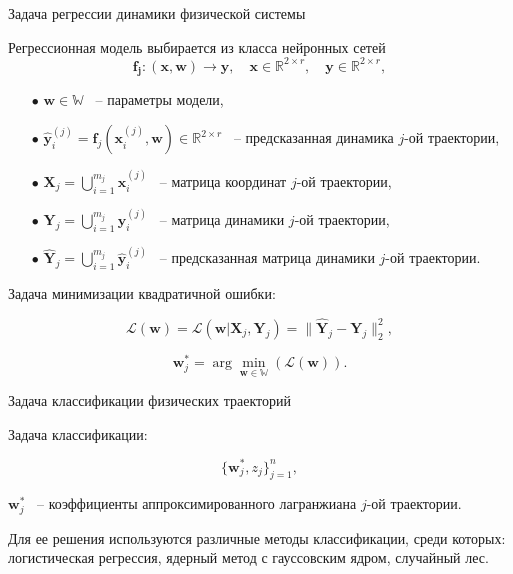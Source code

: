 \documentclass{beamer}
\begin{document}
\begin{frame}{Задача регрессии динамики физической системы}

    Регрессионная модель выбирается из класса нейронных сетей
    $$\mathbf{f_j} \colon (\mathbf{x}, \mathbf{w}) \to \mathbf{y}, \quad \mathbf{x} \in \mathbb{R}^{2 \times r}, \quad \mathbf{y} \in \mathbb{R}^{2 \times r},$$ 
    
    \begin{itemize}
    
            \item[$\bullet$] $\mathbf{w} \in \mathbb{W}$ ~-- параметры модели, 

            \item[$\bullet$] $\hat{\mathbf{y}}_i^{(j)} = \mathbf{f}_j (\mathbf{x}_i^{(j)}, \mathbf{w}) \in \mathbb{R}^{2 \times r}$ ~-- предсказанная динамика $j$-ой траектории,
        
            \item[$\bullet$] $\mathbf{X}_j = \bigcup_{i=1}^{m_j} \mathbf{x}_i^{(j)}$ ~-- матрица координат $j$-ой траектории,
            
            \item[$\bullet$] $\mathbf{Y}_j = \bigcup_{i=1}^{m_j} \mathbf{y}_i^{(j)}$ ~-- матрица динамики $j$-ой траектории,
            
            \item[$\bullet$] $\hat{\mathbf{Y}}_j = \bigcup_{i=1}^{m_j} \hat{\mathbf{y}}_i^{(j)}$ ~-- предсказанная матрица динамики $j$-ой траектории.
        
        \end{itemize}

        Задача минимизации квадратичной ошибки: 

        $$\mathcal{L}(\textbf{w}) = \mathcal{L}(\mathbf{w} | \mathbf{X}_j, \mathbf{Y}_j) = \| \hat{\mathbf{Y}}_j - \mathbf{Y}_j \|_2^2,$$
    
        $$\textbf{w}_j^* = \arg \min_{\mathbf{w} \in \mathbb{W}} \left( \mathcal{L}(\textbf{w}) \right).$$

\end{frame}


\begin{frame}{Задача классификации физических траекторий}

        Задача классификации:

        $$\{\textbf{w}^*_j, z_j\}_{j=1}^n,$$
        
        $\textbf{w}^*_j$ ~-- коэффициенты аппроксимированного лагранжиана $j$-ой траектории.
    
        Для ее решения используются различные методы классификации, среди которых: логистическая регрессия, ядерный метод с гауссовским ядром, случайный лес.


\end{frame}
\end{document}
